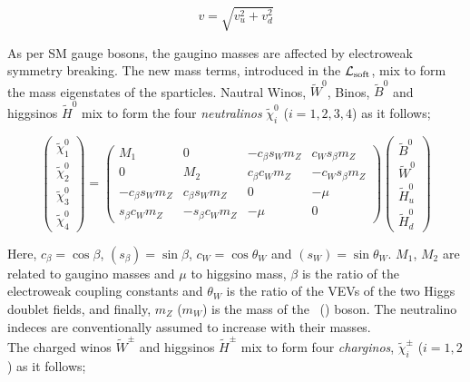 				\begin{equation*}
					v = \sqrt{v_u^2 + v_d^2}
					\label{eq:MSSM_HiggsVEVs}
				\end{equation*}

				
				As per SM gauge bosons, the gaugino masses are affected by electroweak symmetry breaking. The new mass terms, introduced in the $\cal L_{\mathrm{soft}}$, mix to form the mass eigenstates of the sparticles. Nautral Winos, $\tilde{W}^0$, Binos, $\tilde{B}^0$ and higgsinos $\tilde{H}^0$ mix to form the four \textit{neutralinos} $\tilde{\chi}^0_i$ ($i=1,2,3,4$)  as it follows; 

				\begin{equation}
				\label{eq:neutralino_mixing}
						\begin{pmatrix}  \tilde{\chi}^{0}_1 \\ \tilde{\chi}^{0}_2 \\ \tilde{\chi}^{0}_3 \\ \tilde{\chi}^{0}_4 \end{pmatrix}	
						= 
						\begin{pmatrix}
							M_1 & 0 & - c_\beta s_W m_Z &  c_W s_\beta m_Z  \\
							0 & M_2 & c_\beta c_W m_Z  &  - c_W s_\beta m_Z \\
							- c_\beta s_W m_Z  & c_\beta s_W m_Z  & 0 & - \mu \\ 
							s_\beta c_W m_Z  & - s_\beta c_W m_Z & - \mu & 0  
						\end{pmatrix}
						\begin{pmatrix}
							\tilde{B}^{0} \\
							\tilde{W}^{0} \\
							\tilde{H}^{0}_u \\
							\tilde{H}^{0}_d
						\end{pmatrix}
				\end{equation}

				\noindent Here, $c_{\beta} = \cos \beta$,  $(s_{\beta}) = \sin \beta$, $c_W = \cos \theta_W$ and $(s_W) = \sin \theta_W$. $M_1$, $M_2$ are related to gaugino masses and $\mu$ to higgsino mass, $\beta$ is the ratio of the electroweak coupling constants and $\theta_W$ is the ratio of the VEVs of the two Higgs doublet fields, and finally, $m_Z$ ($m_W$) is the mass of the \Zboson\ (\Wboson) boson. The neutralino indeces are conventionally assumed to increase with their masses. 
				\\The charged winos $\tilde{W}^{\pm}$ and higgsinos $\tilde{H}^{\pm}$ mix to form four \textit{charginos}, $\tilde{\chi}^{\pm}_i$ ($i=1,2$) as it follows;

